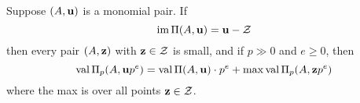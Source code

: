 \documentclass[11pt]{amsart}
\renewcommand{\!}[1]{{\color{red}\text{$\star$\,}#1\,$\star$}}
\begin{document}



\begin{proposition}
Suppose $(A, \mathbf{u})$ is a monomial pair.  If \[ \operatorname{im} \Pi(A, \mathbf{u}) = \mathbf{u} - \mathcal{Z}\] then every pair $(A, \mathbf{z})$ with $\mathbf{z} \in \mathcal{Z}$ is small, and if $p \gg 0$ and $e \geq 0$, then 
\[ \operatorname{val} \Pi_p(A, \mathbf{u} p^e) = \operatorname{val} \Pi(A, \mathbf{u}) \cdot p^e + \max \operatorname{val} \Pi_p(A, \mathbf{z}p^e) \]
where the max is over all points $\mathbf{z} \in \mathcal{Z}$.
\end{proposition}
\end{document}
